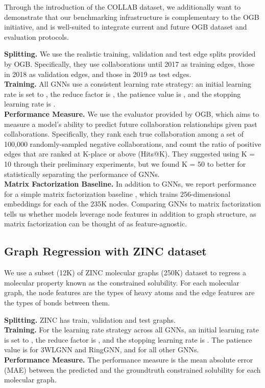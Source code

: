 \documentclass{article}
\begin{document}
Through the introduction of the COLLAB dataset, we additionally want to demonstrate that our benchmarking infrastructure is complementary to the OGB initiative, and is well-suited to integrate current and future OGB dataset and evaluation protocols.

{\bf Splitting.} 
We use the realistic training, validation and test edge splits provided by OGB. 
Specifically, they use collaborations until 2017 as training edges, those in 2018 as validation edges, and those in 2019 as test edges. \\
{\bf Training.} All GNNs use a consistent learning rate strategy: an initial learning rate is set to , the reduce factor is , the patience value is , and the stopping learning rate is . \\
{\bf Performance Measure.} 
We use the evaluator provided by OGB, which aims to measure a model's ability to predict future collaboration relationships given past collaborations. 
Specifically, they rank each true collaboration among a set of 100,000 randomly-sampled negative collaborations, and count the ratio of positive edges that are ranked at K-place or above (Hits@K). 
They suggested using K = 10 through their preliminary experiments, but we found K = 50 to better for statistically separating the performance of GNNs. \\
{\bf Matrix Factorization Baseline.}
In addition to GNNs, we report performance for a simple matrix factorization baseline \cite{hu2020ogb}, which trains 256-dimensional embeddings for each of the 235K nodes.
Comparing GNNs to matrix factorization tells us whether models leverage node features in addition to graph structure, as matrix factorization can be thought of as feature-agnostic.



\subsection{Graph Regression with ZINC dataset}
We use a subset (12K) of ZINC molecular graphs (250K) dataset \cite{irwin2012zinc} to regress a molecular property known as the constrained solubility. 
For each molecular graph, the node features are the types of heavy atoms and the edge features are the types of bonds between them.

{\bf Splitting.} ZINC has  train,  validation and  test graphs.\\
{\bf Training.} For the learning rate strategy across all GNNs, an initial learning rate is set to , the reduce factor is , and the stopping learning rate is . The patience value is  for 3WLGNN and RingGNN, and  for all other GNNs.\\
{\bf Performance Measure.} The performance measure is the mean absolute error (MAE) between the predicted and the groundtruth constrained solubility for each molecular graph.
\end{document}
